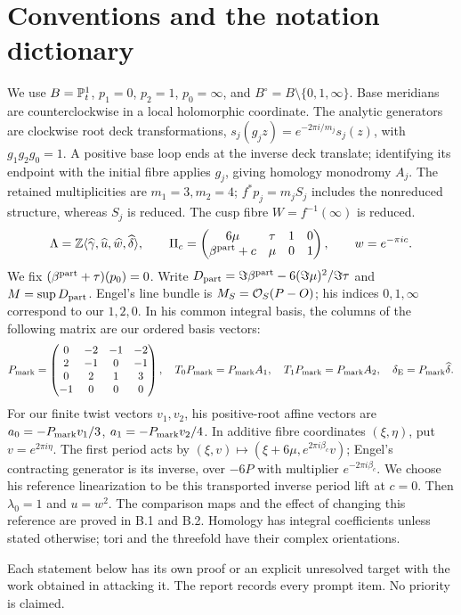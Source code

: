 \section*{Conventions and the notation dictionary}
We use $B=\mathbb P^1_t$, $p_1=0$, $p_2=1$, $p_0=\infty$, and
$B^\circ=B\setminus\{0,1,\infty\}$. Base meridians are counterclockwise
in a local holomorphic coordinate. The analytic generators are clockwise
root deck transformations, $s_j(g_jz)=e^{-2\pi i/m_j}s_j(z)$, with
$g_1g_2g_0=1$. A positive base loop ends at the inverse deck translate;
identifying its endpoint with the initial fibre applies $g_j$, giving
homology monodromy $A_j$. The retained multiplicities are $m_1=3,m_2=4$;
$f^*p_j=m_jS_j$ includes the nonreduced structure, whereas $S_j$ is reduced.
The cusp fibre $W=f^{-1}(\infty)$ is reduced.
\[
 \Lambda=\mathbb Z\langle\widehat\gamma,\widehat u,\widehat w,\widehat\delta\rangle,\qquad
 \Pi_c=\begin{pmatrix}6\mu&\tau&1&0\\\beta^{\mathrm{part}}+c&\mu&0&1\end{pmatrix},
 \qquad w=e^{-\pi ic}.
\]
We fix $(\beta^{\mathrm{part}}+\tau)(p_0)=0$. Write
$D_{\mathrm{part}}=\Im\beta^{\mathrm{part}}-6(\Im\mu)^2/\Im\tau$ and
$M=\sup D_{\mathrm{part}}$. Engel's line bundle is
$M_S=\mathcal O_S(P-O)$; his indices $0,1,\infty$ correspond to our $1,2,0$.
In his common integral basis, the columns of the following matrix are
our ordered basis vectors:
\[
 P_{\rm mark}=\begin{pmatrix}
 0&-2&-1&-2\\2&-1&0&-1\\0&2&1&3\\-1&0&0&0
 \end{pmatrix},\quad
 T_0P_{\rm mark}=P_{\rm mark}A_1,\quad
 T_1P_{\rm mark}=P_{\rm mark}A_2,\quad
 \delta_{\rm E}=P_{\rm mark}\widehat\delta.
\]
For our finite twist vectors $v_1,v_2$, his positive-root affine vectors
are $a_0=-P_{\rm mark}v_1/3$, $a_1=-P_{\rm mark}v_2/4$.
In additive fibre coordinates $(\xi,\eta)$, put $v=e^{2\pi i\eta}$.
The first period acts by
$(\xi,v)\mapsto(\xi+6\mu,e^{2\pi i\beta_c}v)$; Engel's contracting
generator is its inverse, over $-6P$ with multiplier $e^{-2\pi i\beta_c}$.
We choose his reference linearization to be this transported inverse
period lift at $c=0$. Then $\lambda_0=1$ and $u=w^2$.
The comparison maps and the effect of changing this reference are
proved in B.1 and B.2. Homology has integral coefficients unless stated
otherwise; tori and the threefold have their complex orientations.

Each statement below has its own proof or an explicit unresolved target
with the work obtained in attacking it. The report records every prompt
item. No priority is claimed.
